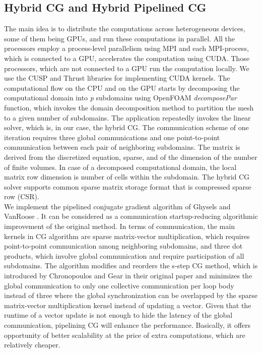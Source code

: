 \documentclass[3p,times]{elsarticle}
\begin{document}
\subsection{Hybrid CG and Hybrid Pipelined CG}
The main idea is to distribute the computations across heterogeneous devices, some of them being GPUs, and run these computations in parallel. All the processors employ a process-level parallelism using MPI and each MPI-process, which is connected to a GPU, accelerates the computation using CUDA. Those processors, which are not connected to a GPU run the computation locally. We use the CUSP \cite{cusp} and Thrust \cite{thrust} libraries for implementing CUDA kernels. The computational flow on the CPU and on the GPU starts by decomposing the computational domain into \emph{p} subdomains using OpenFOAM \emph{decomposePar} function, which invokes the domain decomposition method to partition the mesh to a given number of subdomains. The application repeatedly invokes the linear solver, which is, in our case, the hybrid CG. The communication scheme of one iteration requires three global communications and one point-to-point communication between each pair of neighboring subdomains. The matrix is derived from the discretized equation, sparse, and of the dimension of the number of finite volumes. In case of a decomposed computational domain, the local matrix row dimension is number of cells within the subdomain. The hybrid CG solver supports common sparse matrix storage format that is compressed sparse row (CSR). \\

We implement the pipelined conjugate gradient algorithm of Ghysels and VanRoose \cite{pipecg}. It can be considered as a communication startup-reducing algorithmic improvement of the original method. In terms of communication, the main kernels in CG algorithm are sparse matrix-vector multiplication, which requires point-to-point communication among neighboring subdomains, and three dot products, which involve global communication and require participation of all subdomains. The algorithm modifies and reorders the s-step CG method, which is introduced by Chronopoulos and Gear in their original paper \cite{s_step} and minimizes the global communication to only one collective communication per loop body instead of three where the global synchronization can be overlapped by the sparse matrix-vector multiplication kernel instead of updating a vector. Given that the runtime of a vector update is not enough to hide the latency of the global communication, pipelining CG will enhance the performance. Basically, it offers opportunity of better scalability at the price of extra computations, which are relatively cheaper. \\
\end{document}
